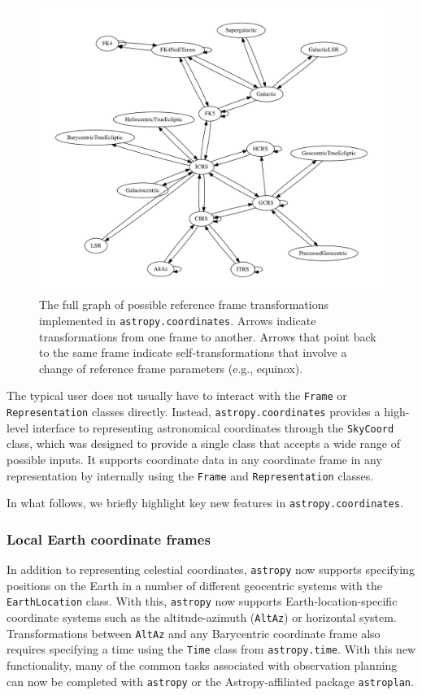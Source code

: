 \documentclass[modern]{aastex61}
\newcommand{\package}[1]{\texttt{#1}\xspace}
\newcommand{\astropy}{Astropy\xspace}
\newcommand{\astropypkg}{\package{astropy}}
\begin{document}
\begin{figure}
\includegraphics[width=\textwidth]{coordinates_graph.pdf}
\caption{%
    The full graph of possible reference frame transformations implemented in
    \texttt{astropy.coordinates}.
    Arrows indicate transformations from one frame to another.
    Arrows that point back to the same frame indicate self-transformations that
    involve a change of reference frame parameters (e.g., equinox).
    \label{fig:frame-transform-graph}
}
\end{figure}

The typical user does not usually have to interact with the \texttt{Frame} or
\texttt{Representation} classes directly.
Instead, \texttt{astropy.coordinates} provides a high-level interface to
representing astronomical coordinates through the \texttt{SkyCoord} class,
which was designed to provide a single class that
accepts a wide range of possible inputs.
It supports coordinate data in any coordinate frame in any representation by
internally using the \texttt{Frame} and \texttt{Representation} classes.

In what follows, we briefly highlight key new features in
\texttt{astropy.coordinates}.

\subsubsection{Local Earth coordinate frames}
In addition to representing celestial
    coordinates, \astropypkg now supports specifying positions on the Earth in
    a number of different geocentric systems with the \texttt{EarthLocation}
    class.
    With this, \astropypkg now supports Earth-location-specific coordinate
    systems such as the altitude-azimuth (\texttt{AltAz}) or horizontal system.
    Transformations between \texttt{AltAz} and any Barycentric coordinate frame
    also requires specifying a time using the \texttt{Time} class from
    \texttt{astropy.time}.
    With this new functionality, many of the common tasks associated with
    observation planning can now be completed with \astropypkg or the
    \astropy-affiliated package \package{astroplan}\citep{astroplan_AAS}.
\end{document}
